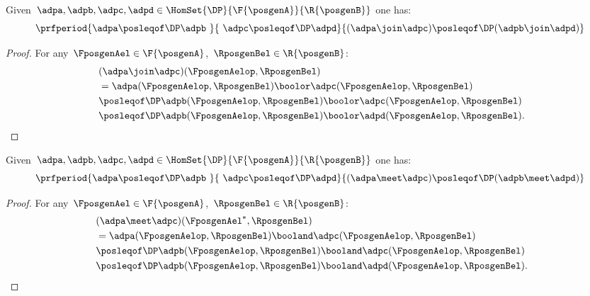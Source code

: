 \begin{lemma}
    \label{lem:coprod_mon}
    Given~$\adpa,\adpb,\adpc,\adpd \in \HomSet{\DP}{\F{\posgenA}}{\R{\posgenB}}$ one has:
    \begin{equation*}
        \prfperiod{\adpa\posleqof\DP \adpb\ }{\ \adpc\posleqof\DP\adpd}{(\adpa\join\adpc)\posleqof\DP (\adpb\join \adpd)}
    \end{equation*}
\end{lemma}
\begin{proof}
    For any~$\FposgenAel\in \F{\posgenA}$,~$\RposgenBel\in \R{\posgenB}$:
    \begin{equation*}
        \begin{aligned}
            ~ & (\adpa \join \adpc)(\FposgenAelop,\RposgenBel)\\
              & =\adpa(\FposgenAelop,\RposgenBel)\boolor \adpc(\FposgenAelop,\RposgenBel)\\
              & \posleqof\DP \adpb(\FposgenAelop,\RposgenBel)\boolor \adpc(\FposgenAelop,\RposgenBel)\\
              & \posleqof\DP \adpb(\FposgenAelop,\RposgenBel)\boolor \adpd(\FposgenAelop,\RposgenBel).
        \end{aligned}
    \end{equation*}
\end{proof}

\begin{lemma}
    \label{lem:intersection_mon}
    Given~$\adpa,\adpb,\adpc,\adpd \in \HomSet{\DP}{\F{\posgenA}}{\R{\posgenB}}$ one has:
    \begin{equation*}
        \prfperiod{\adpa\posleqof\DP \adpb\ }{\ \adpc\posleqof\DP \adpd}{(\adpa\meet \adpc)\posleqof\DP (\adpb\meet \adpd)}
    \end{equation*}
\end{lemma}
\begin{proof}
    For any~$\FposgenAel\in \F{\posgenA}$,~$\RposgenBel\in \R{\posgenB}$:
    \begin{equation*}
        \begin{aligned}
            ~ & (\adpa \meet \adpc)(\FposgenAel^*,\RposgenBel)\\
              & =\adpa(\FposgenAelop,\RposgenBel)\booland \adpc(\FposgenAelop,\RposgenBel)\\
              & \posleqof\DP \adpb(\FposgenAelop,\RposgenBel)\booland \adpc(\FposgenAelop,\RposgenBel)\\
              & \posleqof\DP \adpb(\FposgenAelop,\RposgenBel)\booland \adpd(\FposgenAelop,\RposgenBel).
        \end{aligned}
    \end{equation*}
\end{proof}
